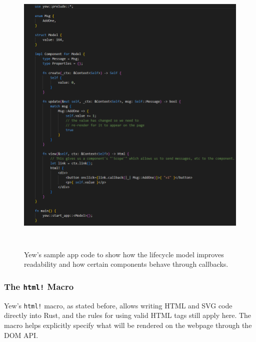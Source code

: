 \documentclass[
    paper=letter,
    parskip=half,
    fontsize=12pt,
    titlepage=firstiscover,
    toc=bibliography,
    numbers=endperiod
]{scrartcl}
\begin{document}
\begin{figure}[H]
    \includegraphics[height=14cm]{yew-sample-code}
    \caption{Yew's sample app code to show how the lifecycle model improves readability and how certain components behave through callbacks.}
\end{figure}

\subsubsection{The \texttt{html!} Macro} \label{subsec:html-macro}

Yew's \texttt{html!} macro, as stated before, allows writing HTML and
SVG code directly into Rust, and the rules for using valid HTML tags
still apply here. The macro helps explicitly specify what will be
rendered on the webpage through the DOM API.
\end{document}
